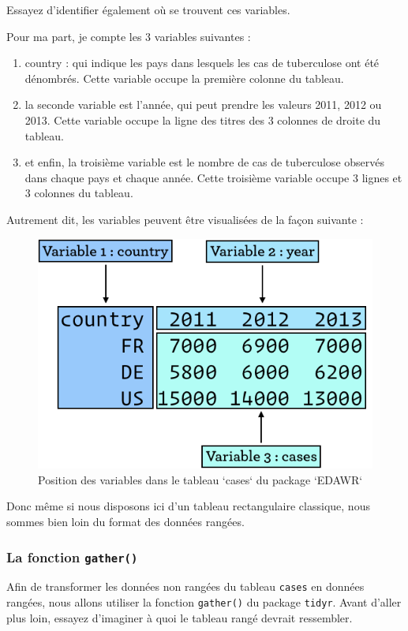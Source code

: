 \documentclass[a4paperpaper,]{article}
\providecommand{\tightlist}{%
  \setlength{\itemsep}{0pt}\setlength{\parskip}{0pt}}
\begin{document}
Essayez d'identifier également où se trouvent ces variables.

Pour ma part, je compte les 3 variables suivantes :

\begin{enumerate}
\def\labelenumi{\arabic{enumi}.}
\tightlist
\item
  country : qui indique les pays dans lesquels les cas de tuberculose ont été dénombrés. Cette variable occupe la première colonne du tableau.
\item
  la seconde variable est l'année, qui peut prendre les valeurs 2011, 2012 ou 2013. Cette variable occupe la ligne des titres des 3 colonnes de droite du tableau.
\item
  et enfin, la troisième variable est le nombre de cas de tuberculose observés dans chaque pays et chaque année. Cette troisième variable occupe 3 lignes et 3 colonnes du tableau.
\end{enumerate}

Autrement dit, les variables peuvent être visualisées de la façon suivante :

\begin{figure}[htpb]

{\centering \includegraphics[width=0.5\linewidth]{images/gather} 

}

\caption{Position des variables dans le tableau `cases` du package `EDAWR`}\label{fig:gather}
\end{figure}

Donc même si nous disposons ici d'un tableau rectangulaire classique, nous sommes bien loin du format des données rangées.

\hypertarget{la-fonction-gather}{%
\subsubsection{\texorpdfstring{La fonction \texttt{gather()}}{La fonction gather()}}\label{la-fonction-gather}}

Afin de transformer les données non rangées du tableau \texttt{cases} en données rangées, nous allons utiliser la fonction \texttt{gather()} du package \texttt{tidyr}. Avant d'aller plus loin, essayez d'imaginer à quoi le tableau rangé devrait ressembler.
\end{document}
